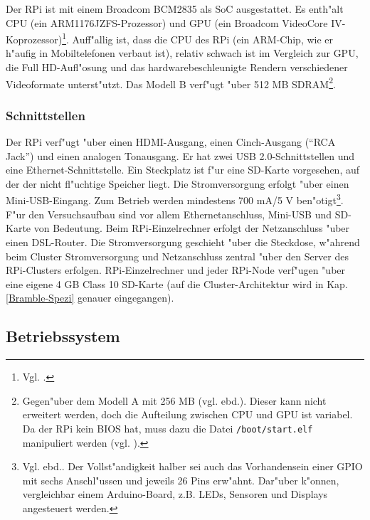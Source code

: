 Der RPi ist mit einem Broadcom BCM2835 als SoC ausgestattet. Es enth"alt CPU (ein ARM1176JZFS-Prozessor) und GPU (ein Broadcom VideoCore IV-Koprozessor)\footnote{Vgl. \cite{scrguide02}.}. Auff"allig ist, dass die CPU des RPi (ein ARM-Chip, wie er h"aufig in Mobiltelefonen verbaut ist), relativ schwach ist im Vergleich zur GPU, die Full HD-Aufl"osung und das hardwarebeschleunigte Rendern verschiedener Videoformate unterst"utzt. Das Modell B verf"ugt "uber 512 MB SDRAM\footnote{Gegen"uber dem Modell A mit 256 MB (vgl. ebd.). Dieser kann nicht erweitert werden, doch die Aufteilung zwischen CPU und GPU ist variabel. Da der RPi kein BIOS hat, muss dazu die Datei \texttt{/boot/start.elf} manipuliert werden (vgl. \cite{pow12}).}.

\subsubsection{Schnittstellen}\label{RPi-Schnittstellen}

Der RPi verf"ugt "uber einen HDMI-Ausgang, einen Cinch-Ausgang ("`RCA Jack"') und einen analogen Tonausgang. Er hat zwei USB 2.0-Schnittstellen und eine Ethernet-Schnittstelle. Ein Steckplatz ist f"ur eine SD-Karte vorgesehen, auf der der nicht fl"uchtige Speicher liegt. Die Stromversorgung erfolgt "uber einen Mini-USB-Eingang. Zum Betrieb werden mindestens 700 mA/5 V ben"otigt\footnote{Vgl. ebd.. Der Vollst"andigkeit halber sei auch das Vorhandensein einer GPIO mit sechs Anschl"ussen und jeweils 26 Pins erw"ahnt. Dar"uber k"onnen, vergleichbar einem Arduino-Board, z.B. LEDs, Sensoren und Displays angesteuert werden.}. 
\enlargethispage*{2cm}
\noindent
F"ur den Versuchsaufbau sind vor allem Ethernetanschluss, Mini-USB und SD-Karte von Bedeutung. Beim RPi-Einzelrechner erfolgt der Netzanschluss "uber einen DSL-Router. Die Stromversorgung geschieht "uber die Steckdose, w"ahrend beim Cluster Stromversorgung und Netzanschluss zentral "uber den Server des RPi-Clusters erfolgen. RPi-Einzelrechner und jeder RPi-Node verf"ugen "uber eine eigene 4 GB Class 10 SD-Karte (auf die Cluster-Architektur wird in Kap. \ref{Bramble-Spezi} genauer eingegangen).

\subsection{Betriebssystem}\label{RPi-OS}

